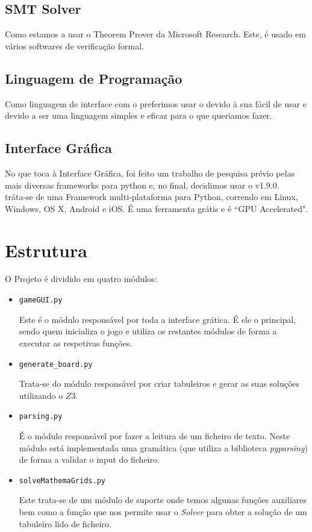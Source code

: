 \documentclass{article}
\begin{document}
\subsection{SMT Solver}
Como {} estamos a usar o {} Theorem Prover da Microsoft Research. Este, é usado em vários softwares de verificação formal. 

\subsection{Linguagem de Programação}
Como linguagem de interface com o {} preferimos usar o {} {} devido à sua {} fácil de usar e devido a ser uma linguagem simples e eficaz para o que queriamos fazer.

\subsection{Interface Gráfica}
No que toca à Interface Gráfica, foi feito um trabalho de pesquisa prévio pelas mais diversas frameworks para python e, no final, decidimos usar o {} v1.9.0. 
\\

{} tráta-se de uma Framework multi-plataforma para Python, correndo em Linux, Windows, OS X, Android e iOS. É uma ferramenta grátis e é ``GPU Accelerated". 

\section{Estrutura}
O Projeto é dividido em quatro módulos:
\begin{itemize}
\item{\texttt{gameGUI.py}

Este é o módulo responsável por toda a interface grática. É ele o principal, sendo quem inicializa o jogo e utiliza os restantes módulos de forma a executar as respetivas funções.}

\item{\texttt{generate\_board.py}

Trata-se do módulo responsável por criar tabuleiros e gerar as suas soluções utilizando o $Z3$.}

\item{\texttt{parsing.py}

É o módulo responsável por fazer a leitura de um ficheiro de texto. Neste módulo está implementada uma gramática (que utiliza a biblioteca {\it{pyparsing}}) de forma a validar o input do ficheiro.}

\item{\texttt{solveMathemaGrids.py}

Este trata-se de um módulo de suporte onde temos algunas funções auxiliares bem como a função que nos permite usar o {\it{Solver}} para obter a solução de um tabuleiro lido de ficheiro.}
\end{itemize}
\end{document}
